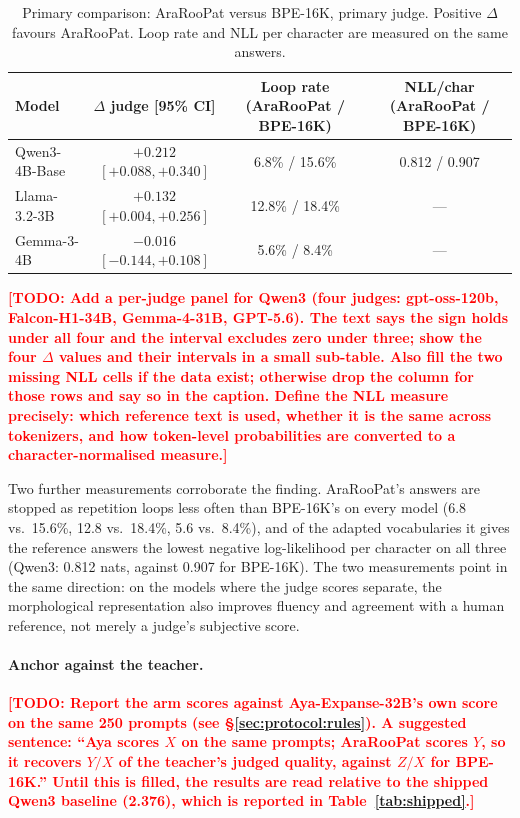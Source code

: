 \documentclass[a4paper,fleqn]{cas-sc}
\newcommand{\todo}[1]{\textcolor{red}{\textbf{[\textsc{TODO}: #1]}}}
\begin{document}
\begin{table}[t]
\centering
\caption{Primary comparison: AraRooPat versus BPE-16K, primary judge. Positive $\Delta$ favours AraRooPat. Loop rate and NLL per character are measured on the same answers.}
\label{tab:equal}
\begin{tabular}{@{}lccc@{}}
\toprule
Model & $\Delta$ judge [95\% CI] & Loop rate (AraRooPat / BPE-16K) & NLL/char (AraRooPat / BPE-16K) \\
\midrule
Qwen3-4B-Base & $+0.212$ $[+0.088,+0.340]$ & 6.8\% / 15.6\% & 0.812 / 0.907 \\
Llama-3.2-3B & $+0.132$ $[+0.004,+0.256]$ & 12.8\% / 18.4\% & --- \\
Gemma-3-4B & $-0.016$ $[-0.144,+0.108]$ & 5.6\% / 8.4\% & --- \\
\bottomrule
\end{tabular}
\vspace{2pt}
\raggedright\footnotesize
\todo{Add a per-judge panel for Qwen3 (four judges: gpt-oss-120b, Falcon-H1-34B, Gemma-4-31B, GPT-5.6). The text says the sign holds under all four and the interval excludes zero under three; show the four $\Delta$ values and their intervals in a small sub-table. Also fill the two missing NLL cells if the data exist; otherwise drop the column for those rows and say so in the caption. Define the NLL measure precisely: which reference text is used, whether it is the same across tokenizers, and how token-level probabilities are converted to a character-normalised measure.}
\end{table}

Two further measurements corroborate the finding. AraRooPat's answers are stopped as repetition loops less often than BPE-16K's on every model (6.8 vs.\ 15.6\%, 12.8 vs.\ 18.4\%, 5.6 vs.\ 8.4\%), and of the adapted vocabularies it gives the reference answers the lowest negative log-likelihood per character on all three (Qwen3: 0.812 nats, against 0.907 for BPE-16K). The two measurements point in the same direction: on the models where the judge scores separate, the morphological representation also improves fluency and agreement with a human reference, not merely a judge's subjective score.

\paragraph{Anchor against the teacher.}
\todo{Report the arm scores against Aya-Expanse-32B's own score on the same 250 prompts (see \S\ref{sec:protocol:rules}). A suggested sentence: ``Aya scores $X$ on the same prompts; AraRooPat scores $Y$, so it recovers $Y/X$ of the teacher's judged quality, against $Z/X$ for BPE-16K.'' Until this is filled, the results are read relative to the shipped Qwen3 baseline (2.376), which is reported in Table~\ref{tab:shipped}.}
\end{document}
